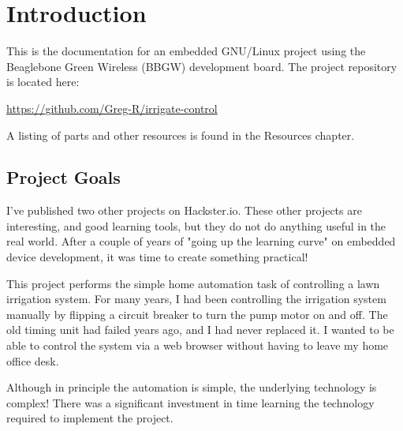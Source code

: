 %
%
%

\chapter{Introduction}

This is the documentation for an embedded GNU/Linux project using the 
Beaglebone Green Wireless (BBGW) development board.  The project repository is located here:

\url{https://github.com/Greg-R/irrigate-control}

A listing of parts and other resources is found in the Resources chapter.

\section{Project Goals}

I've published two other projects on Hackster.io.  These other projects are 
interesting, and good learning tools, but they do not do anything useful in the 
real world.  After a couple of years of "going up the learning curve" on 
embedded device development, it was time to create something practical!

This project performs the simple home automation task of controlling a lawn 
irrigation system.  For many years, I had been controlling the irrigation 
system manually by flipping a circuit breaker to turn the pump motor on and 
off.  The old timing unit had failed years ago, and I had never replaced it.  
I wanted to be able to control the system via a web browser without 
having to leave my home office desk.

Although in principle the automation is simple, the underlying technology is 
complex!  There was a significant investment in time learning the technology 
required to implement the project.

